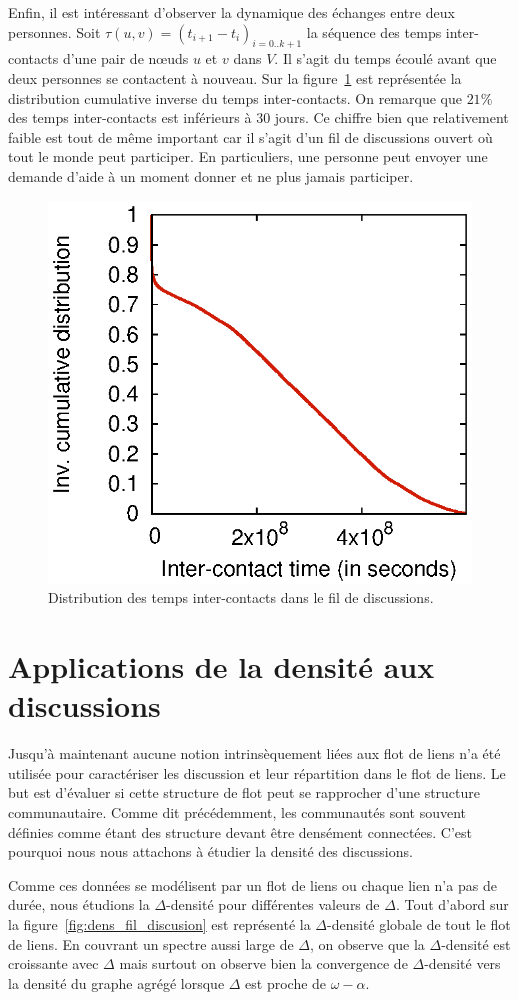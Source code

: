 Enfin, il est intéressant d'observer la dynamique des échanges entre deux personnes.
Soit $\tau(u,v) = (t_{i+1}-t_i)_{i=0..k+1}$ la séquence des temps inter-contacts d'une pair de n\oe uds $u$ et $v$ dans $V$.
Il s'agit du temps écoulé avant que deux personnes se contactent à nouveau.
Sur la figure~\ref{fig:ict_discussion} est représentée la distribution cumulative inverse du temps inter-contacts. 
On remarque que $21\%$ des temps inter-contacts est inférieurs à 30 jours.
Ce chiffre bien que relativement faible est tout de même important car il s'agit d'un fil de discussions ouvert où tout le monde peut participer. 
En particuliers, une personne peut envoyer une demande d'aide à un moment donner et ne plus jamais participer.
\begin{figure}
	\centering
	\includegraphics[width=0.49\linewidth]{img/mailing/ict-ccdf.eps}
	\caption{Distribution des temps inter-contacts dans le fil de discussions.}
	\label{fig:ict_discussion}
\end{figure}

\section{Applications de la densité aux discussions}

Jusqu'à maintenant aucune notion intrinsèquement liées aux flot de liens n'a été utilisée pour caractériser les discussion et leur répartition dans le flot de liens.
Le but est d'évaluer si cette structure de flot peut se rapprocher d'une structure communautaire.
Comme dit précédemment, les communautés sont souvent définies comme étant des structure devant être densément connectées.
C'est pourquoi nous nous attachons à étudier la densité des discussions.

Comme ces données se modélisent par un flot de liens ou chaque lien n'a pas de durée, nous étudions la $\Delta$-densité pour différentes valeurs de $\Delta$.
Tout d'abord sur la figure~\ref{fig:dens_fil_discusion} est représenté la $\Delta$-densité globale de tout le flot de liens.
En couvrant un spectre aussi large de $\Delta$, on observe que la $\Delta$-densité est croissante avec $\Delta$ mais surtout on observe bien la convergence de $\Delta$-densité vers la densité du graphe agrégé lorsque $\Delta$ est proche de $\omega - \alpha$.

